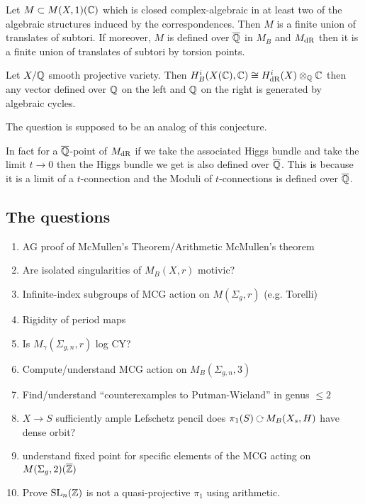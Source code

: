 \documentclass[12pt]{article}
\begin{document}
\begin{theorem}
Let $M \subset M(X, 1)(\mathbb{C})$ which is closed complex-algebraic in at least two of the algebraic structures induced by the correspondences. Then $M$ is a finite union of translates of subtori. If moreover, $M$ is defined over $\overline{\mathbb{Q}}$ in $M_{B}$ and $M_{\mathrm{dR}}$ then it is a finite union of translates of subtori by torsion points. 
\end{theorem}


\begin{conj}[Period]
Let $X / \mathbb{Q}$ smooth projective variety. Then $H^i_B(X(\mathbb{C}), \mathbb{C}) \cong H^i_{\mathrm{dR}}(X) \otimes_{\mathbb{Q}} \mathbb{C}$ then any vector defined over $\mathbb{Q}$ on the left and $\mathbb{Q}$ on the right is generated by algebraic cycles. 
\end{conj}

The question is supposed to be an analog of this conjecture. 


\begin{rmk}
In fact for a $\overline{\mathbb{Q}}$-point of $M_{\mathrm{dR}}$ if we take the associated Higgs bundle and take the limit $t \to 0$ then the Higgs bundle we get is also defined over $\overline{\mathbb{Q}}$. This is because it is a limit of a $t$-connection and the Moduli of $t$-connections is defined over $\overline{\mathbb{Q}}$.
\end{rmk}

\subsection{The questions}

\begin{enumerate}
\item AG proof of McMullen's Theorem/Arithmetic McMullen's theorem
\item Are isolated singularities of $M_B(X,r)$ motivic?
\item Infinite-index subgroups of MCG action on $M(\Sigma_g, r)$ (e.g. Torelli)
\item Rigidity of period maps
\item Is $M_\gamma(\Sigma_{g,n}, r)$ log CY?
\item Compute/understand MCG action on $M_B(\Sigma_{g,n}, 3)$
\item Find/understand ``counterexamples to Putman-Wieland'' in genus $\le 2$
\item $X \to S$ sufficiently ample Lefschetz pencil does $\pi_1(S) \acts M_B(X_s, H)$ have dense orbit?
\item understand fixed point for specific elements of the MCG acting on $M(\Sigma_g, 2)(\overline{\mathbb{Z}})$
\item Prove $\mathrm{SL}_n(\mathbb{Z})$ is not a quasi-projective $\pi_1$ using arithmetic. 
\end{enumerate}
\end{document}
